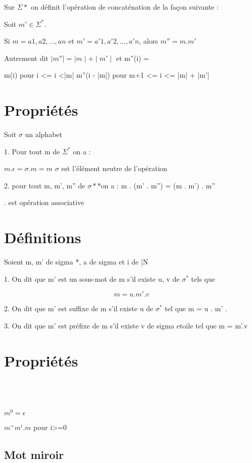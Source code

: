 \documentclass[12pt, a4paper]{report}
\begin{document}
Sur $\Sigma *$ on définit l'opération de concaténation de la façon suivante :

Soit $m' \in \Sigma^{*}$.

Si $m = a1, a2, ..., an$ et $m' = a'1, a'2, ..., a'n$,
alors $m'' = m . m' $ %

Autrement dit $ \mid m'' \mid  = \mid m \mid +  \mid m' \mid $
et m''(i) = { m(i) pour i <= i <|m|
m''(i - |m|) pour m+1 <= i <= |m| + |m'|

\section{Propriétés}

Soit $\sigma$ un alphabet

1. Pour tout  m de $\Sigma^{*}$ on a :

$m . \epsilon = \sigma . m = m$
$\sigma$ est l'élément neutre de l'opération

2. pour tout m, m', m'' de $\sigma*{*}$on a : m . (m' . m'') = (m . m') . m''

. est opération associative

\section{Définitions}

Soient m, m' de sigma *, a de sigma et i de |N

1. On dit que m' est un sous-mot de m s'il existe u, v de $\sigma^{*}$ tels que

\[
  m = u . m' . v
\]

2. On dit que m' est suffixe de m s'il existe u de $\sigma^{*}$ tel que
m = u . m' . %

3. On dit que m' est préfixe de m s'il existe v de sigma etoile tel que
m = m'.v

\section{Propriétés}

\subsection{~}

$m^0 = \epsilon$

$m^ = m^i . m$ pour i>=0

\subsection{Mot miroir}

}
\end{document}
